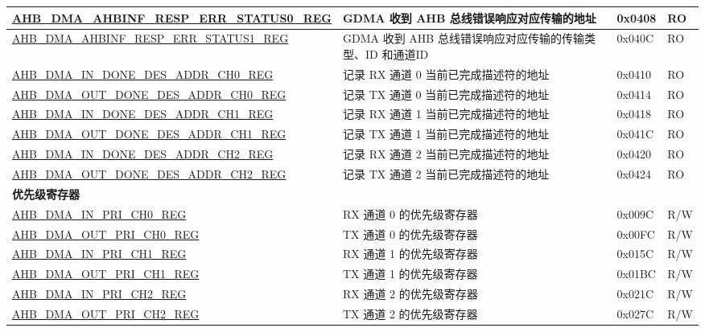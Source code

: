 \begin{longtable}{ | p{8cm} | p{8cm} | p{1.3cm} | p{1.5cm} | }
\hyperref[regdesc:AHBDMAAHBINFRESPERRSTATUS0REG]{AHB\_DMA\_AHBINF\_RESP\_ERR\_STATUS0\_REG} & GDMA 收到 AHB 总线错误响应对应传输的地址 & 0x0408 & RO \\ \hline
\hyperref[regdesc:AHBDMAAHBINFRESPERRSTATUS1REG]{AHB\_DMA\_AHBINF\_RESP\_ERR\_STATUS1\_REG} & GDMA 收到 AHB 总线错误响应对应传输的传输类型、ID 和通道ID & 0x040C & RO \\ \hline
\hyperref[regdesc:AHBDMAINDONEDESADDRCHNREG]{AHB\_DMA\_IN\_DONE\_DES\_ADDR\_CH0\_REG} & 记录 RX 通道 0 当前已完成描述符的地址 & 0x0410 & RO \\ \hline
\hyperref[regdesc:AHBDMAOUTDONEDESADDRCHNREG]{AHB\_DMA\_OUT\_DONE\_DES\_ADDR\_CH0\_REG} & 记录 TX 通道 0 当前已完成描述符的地址 & 0x0414 & RO \\ \hline
\hyperref[regdesc:AHBDMAINDONEDESADDRCHNREG]{AHB\_DMA\_IN\_DONE\_DES\_ADDR\_CH1\_REG} & 记录 RX 通道 1 当前已完成描述符的地址 & 0x0418 & RO \\ \hline
\hyperref[regdesc:AHBDMAOUTDONEDESADDRCHNREG]{AHB\_DMA\_OUT\_DONE\_DES\_ADDR\_CH1\_REG} & 记录 TX 通道 1 当前已完成描述符的地址 & 0x041C & RO \\ \hline
\hyperref[regdesc:AHBDMAINDONEDESADDRCHNREG]{AHB\_DMA\_IN\_DONE\_DES\_ADDR\_CH2\_REG} & 记录 RX 通道 2 当前已完成描述符的地址 & 0x0420 & RO \\ \hline
\hyperref[regdesc:AHBDMAOUTDONEDESADDRCHNREG]{AHB\_DMA\_OUT\_DONE\_DES\_ADDR\_CH2\_REG} & 记录 TX 通道 2 当前已完成描述符的地址 & 0x0424 & RO \\ \hline
\multicolumn{4}{|l|}{\textbf{优先级寄存器}} \\ \hline
\hyperref[regdesc:AHBDMAINPRICHNREG]{AHB\_DMA\_IN\_PRI\_CH0\_REG} & RX 通道 0 的优先级寄存器 & 0x009C & R/W \\ \hline
\hyperref[regdesc:AHBDMAOUTPRICHNREG]{AHB\_DMA\_OUT\_PRI\_CH0\_REG} & TX 通道 0 的优先级寄存器 & 0x00FC & R/W \\ \hline
\hyperref[regdesc:AHBDMAINPRICHNREG]{AHB\_DMA\_IN\_PRI\_CH1\_REG} & RX 通道 1 的优先级寄存器 & 0x015C & R/W \\ \hline
\hyperref[regdesc:AHBDMAOUTPRICHNREG]{AHB\_DMA\_OUT\_PRI\_CH1\_REG} & TX 通道 1 的优先级寄存器 & 0x01BC & R/W \\ \hline
\hyperref[regdesc:AHBDMAINPRICHNREG]{AHB\_DMA\_IN\_PRI\_CH2\_REG} & RX 通道 2 的优先级寄存器 & 0x021C & R/W \\ \hline
\hyperref[regdesc:AHBDMAOUTPRICHNREG]{AHB\_DMA\_OUT\_PRI\_CH2\_REG} & TX 通道 2 的优先级寄存器 & 0x027C & R/W \\ \hline

\end{longtable}
